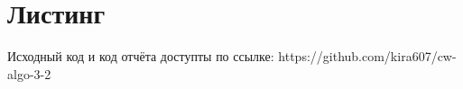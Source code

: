 \section{Листинг}

Исходный код и код отчёта доступты по ссылке: 
https://github.com/kira607/cw-algo-3-2